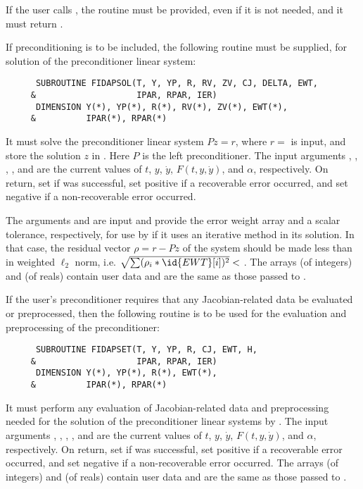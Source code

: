 \begin{Steps}
  {\warn}If the user calls , the routine  must
  be provided, even if it is not needed, and it must return .

  If preconditioning is to be included, the following routine must be
  supplied, for solution of the preconditioner linear system:
\begin{verbatim}
      SUBROUTINE FIDAPSOL(T, Y, YP, R, RV, ZV, CJ, DELTA, EWT, 
     &                    IPAR, RPAR, IER)
      DIMENSION Y(*), YP(*), R(*), RV(*), ZV(*), EWT(*), 
     &          IPAR(*), RPAR(*)
\end{verbatim}
  It must solve the preconditioner linear system $Pz = r$, where $r =$  
  is input, and store the solution $z$ in . Here $P$ is the left 
  preconditioner.
  The input arguments , , , , and  are the
  current values of $t$, $y$, $\dot{y}$, $F(t,y,\dot{y})$, and $\alpha$, respectively.
  On return, set  if  was successful, set 
  positive if a recoverable error occurred, and set  negative if a 
  non-recoverable error occurred.

  The arguments  and  are input and provide the error weight
  array and a scalar tolerance, respectively, for use by  if it uses
  an iterative method in its solution.  In that case, the residual vector
  $\rho = r - Pz$ of the system should be made less than  in weighted
  $\ell_2$ norm, i.e. $\sqrt{\sum(\rho_i * \id{EWT}[i])^2} < $ .
  The arrays  (of integers) and  (of reals) contain user data
  and are the same as those passed to .

  If the user's preconditioner requires that any Jacobian-related data be evaluated
  or preprocessed, then the following routine is to be used for the evaluation and 
  preprocessing of the preconditioner:
\begin{verbatim}
      SUBROUTINE FIDAPSET(T, Y, YP, R, CJ, EWT, H, 
     &                    IPAR, RPAR, IER)
      DIMENSION Y(*), YP(*), R(*), EWT(*), 
     &          IPAR(*), RPAR(*) 
\end{verbatim}
  It must perform any evaluation of Jacobian-related data and preprocessing needed
  for the solution of the preconditioner linear systems by .
  The input arguments , , , , and  are the
  current values of $t$, $y$, $\dot{y}$, $F(t,y,\dot{y})$, and $\alpha$, respectively.
  On return, set  if  was successful, set 
  positive if a recoverable error occurred, and set  negative if a 
  non-recoverable error occurred.
  The arrays  (of integers) and  (of reals) contain user data
  and are the same as those passed to .


\end{Steps}
